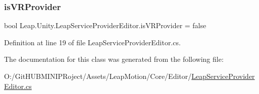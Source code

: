 \subsubsection{\texorpdfstring{isVRProvider}{isVRProvider}}
{\footnotesize\ttfamily bool Leap.\+Unity.\+Leap\+Service\+Provider\+Editor.\+is\+V\+R\+Provider = false\hspace{0.3cm}{\ttfamily [protected]}}



Definition at line 19 of file Leap\+Service\+Provider\+Editor.\+cs.



The documentation for this class was generated from the following file\+:\begin{DoxyCompactItemize}
\item 
O\+:/\+Git\+H\+U\+B\+M\+I\+N\+I\+P\+Roject/\+Assets/\+Leap\+Motion/\+Core/\+Editor/\mbox{\hyperlink{_leap_service_provider_editor_8cs}{Leap\+Service\+Provider\+Editor.\+cs}}\end{DoxyCompactItemize}
